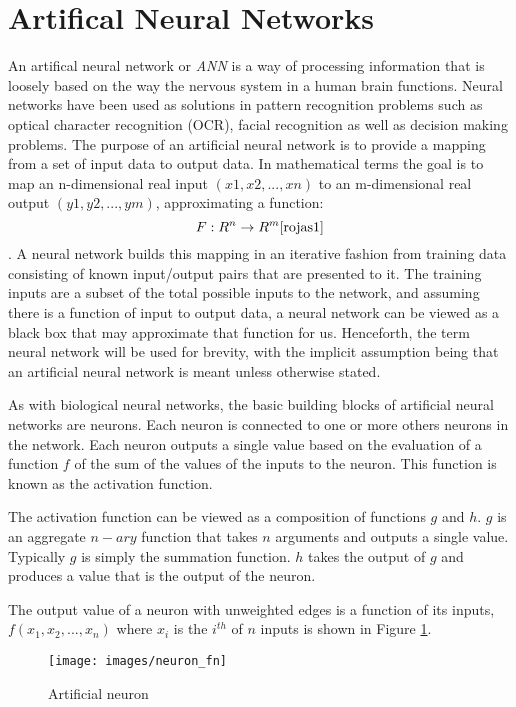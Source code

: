 \section{Artifical Neural Networks}
An artifical neural network or {\it ANN} is a way of processing
information that is loosely based on the way the nervous system in a
human brain functions.
Neural networks have been used as solutions in pattern recognition problems such as optical character recognition (OCR)\cite{ocr1,ocr2}, facial recognition\cite{face} as well as decision making problems\cite{decisionMaking1,decisionMaking2}.
The purpose of an artificial neural network is to provide a mapping from a set of input data to output data. 
In mathematical terms the goal is to map an n-dimensional real input
$(x1,x2,...,xn)$ to an m-dimensional real output $(y1,y2,...,ym)$, 
approximating a function: \begin{displaymath} F : R^n \rightarrow R^m \cite{rojas1}\end{displaymath}. 
A neural network builds this mapping in an iterative fashion from training data consisting of known input/output pairs that are presented to it. 
The training inputs are a subset of the total possible inputs to the network, and assuming there is a function of input to output data, a neural network can be viewed as a black box that may approximate that function for us.
Henceforth, the term neural network will be used for brevity, with the implicit assumption being that an artificial neural network is meant unless otherwise stated.

As with biological neural networks, the basic building blocks of artificial neural networks are neurons. 
Each neuron is connected to one or more others neurons in the network. 
Each neuron outputs a single value based on the evaluation of a function $f$ of the sum of the values of the inputs to the neuron.
This function is known as the activation function.

The activation function can be viewed as a composition of functions
$g$ and $h$.
$g$ is an aggregate $n-ary$ function that takes $n$ arguments and outputs a
single value.
Typically $g$ is simply the summation function.
$h$ takes the output of $g$ and produces a value that is the output of
the neuron. 

The output value of a neuron with unweighted edges is a function of
its inputs, $f(x_1, x_2, ..., x_n)$ where $x_i$ is the $i^{th}$ of $n$
inputs is shown in Figure \ref{neuron}.

\begin{figure}[h!]
  \centering
  \texttt{[image: images/neuron\_fn]}
  \caption{Artificial neuron}
  \label{neuron}
\end{figure}

